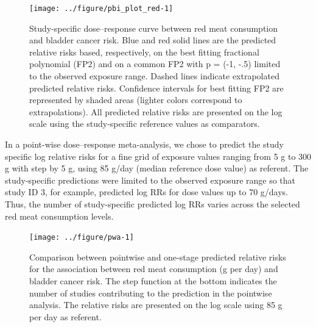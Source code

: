 \documentclass[11pt,a4paper,twoside,openany]{book}\usepackage{knitr}
\begin{document}
{{\begin{knitrout}\footnotesize
{}\color{fgcolor}\begin{figure}[h]

{\centering \texttt{[image: ../figure/pbi\_plot\_red-1]} 

}

\caption[Study-specific dose--response curve between red meat consumption and bladder cancer risk]{Study-specific dose--response curve between red meat consumption and bladder cancer risk. Blue and red solid lines are the predicted relative risks based, respectively, on the best fitting fractional polynomial (FP2) and on a common FP2 with p = (-1, -.5) limited to the observed exposure range. Dashed lines indicate extrapolated predicted relative risks. Confidence intervals for best fitting FP2 are represented by shaded areas (lighter colors correspond to extrapolations). All predicted relative risks are presented on the log scale using the study-specific reference values as comparators.}\label{fig:pbi_plot_red}
\end{figure}


\end{knitrout}

\clearpage

In a point-wise dose--response meta-analysis, we chose to predict the study specific log relative risks for a fine grid of exposure values ranging from 5 g to 300 g with step by 5 g, using 85 g/day (median reference dose value) as referent. The study-specific predictions were limited to the observed exposure range so that study ID 3, for example, predicted log RRs for dose values up to 70 g/days. Thus, the number of study-specific predicted log RRs varies across the selected red meat consumption levels. 

\begin{knitrout}\footnotesize
{}\color{fgcolor}\begin{figure}[h]

{\centering \texttt{[image: ../figure/pwa-1]} 

}

\caption[Comparison between pointwise and one-stage predicted relative risks for the association between red meat consumption (g per day) and bladder cancer risk]{Comparison between pointwise and one-stage predicted relative risks for the association between red meat consumption (g per day) and bladder cancer risk. The step function at the bottom indicates the number of studies contributing to the prediction in the pointwise analysis. The relative risks are presented on the log scale using 85 g per day as referent.}\label{fig:pwa}
\end{figure}



\end{knitrout}}}
\end{document}
